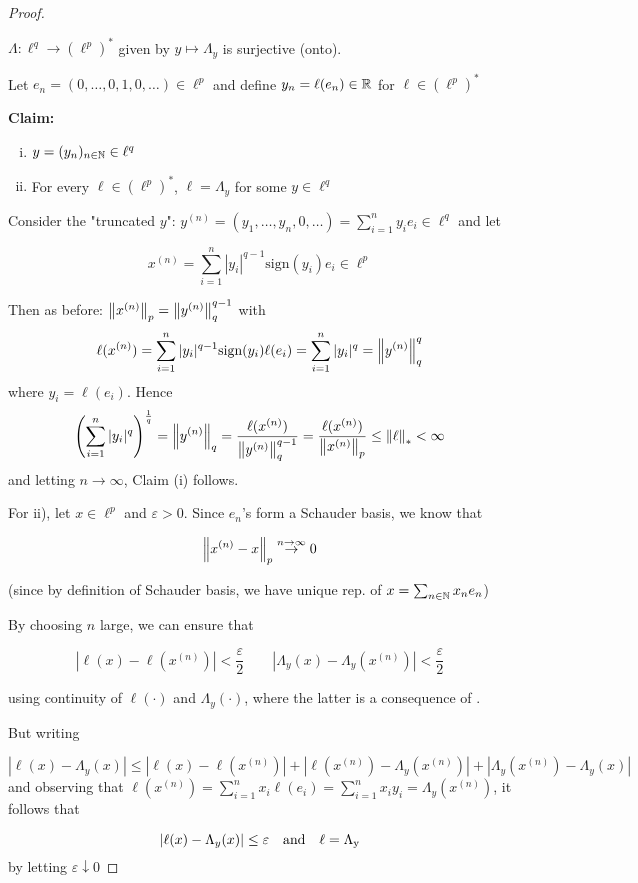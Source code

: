 \documentclass{article}
\begin{document}
\begin{proof}
\begin{lemma}
     \(\Lambda: \ell^q \to (\ell^p)^*\) given by  \(y \mapsto \Lambda_y\) is surjective (onto).
\end{lemma}  
Let  \(e_n = (0, \ldots, 0, 1, 0, \ldots) \in \ell^p\) and define  \(y_n = \ell(e_n) \in \mathbb{R} \)  for  \(\ell \in (\ell^p)^*\)

\textbf{Claim:} 
\begin{enumerate}[i)]
    \item  \(y = (y_n)_{n \in \mathbb{N}} \in \ell^q\)
    \item  For every \(\ell \in (\ell^p)^*\), \(\ell = \Lambda_y\) for some  \(y \in \ell^q \)
\end{enumerate}  

Consider the "truncated $y$":  \(y^{(n)}=(y_1, \ldots, y_n, 0, \ldots) = \sum_{i=1}^n y_i e_i \in \ell^q\) and let

\[x^{(n)}=\sum_{i=1}^{n}|y_{i}|^{q-1} \textrm{sign}(y_i) e_i \in \ell^p\] 

Then as before:  \(\left\|{x^{(n)}}\right\|_p = \left\|{y^{(n)}}\right\|_q^{q-1}\)  
with 
\[
\ell(x^{(n)})=\sum_{i=1}^{n}|y_{i}|^{q-1} \textrm{sign}(y_i) \ell(e_i) = \sum_{i=1}^n |y_i|^q=\left\|{y^{(n)}}\right\|^q_q  
\]
where  \(y_i = \ell(e_i)\). Hence
\[
 \left(\sum_{i=1}^n |y_i|^q \right)^{\frac{1}{q}} = \left\|{y^{(n)}}\right\|_q = \frac{\ell(x^{(n)})}{\left\|{y^{(n)}}\right\|_q^{q-1}} = \frac{\ell(x^{(n)})}{\left\|{x^{(n)}}\right\|_p} \leq \left\|{\ell}\right\|_* < \infty
\]
and letting  \(n \to \infty\), Claim (i) follows.  

For ii), let  \(x \in \ell^p\) and  \(\varepsilon > 0\). Since  \(e_n\)'s form a Schauder basis, we know that  

\[\left\|{x^{(n)}-x}\right\|_p \overset{n \to \infty}{\rightarrow} 0\]  

(since by definition of Schauder basis, we have unique rep. of  \(x = \sum_{n \in \mathbb{N}} x_n e_n\))

By choosing  \(n\) large, we can ensure that  

\[|\ell(x)-\ell(x^{(n)})|<\frac{\varepsilon}{2} \qquad |\Lambda_y(x)-\Lambda_y(x^{(n)})| < \frac{\varepsilon}{2}\]  

using continuity of  \(\ell(\cdot)\) and  \(\Lambda_y(\cdot)\), where the latter is a consequence of .  

But writing  

\begin{equation}
|\ell(x)-\Lambda_y(x)| \leq |\ell(x)- \ell(x^{(n)})| + |\ell(x^{(n)}) - \Lambda_y(x^{(n)})|+|\Lambda_y(x^{(n)})-\Lambda_y(x)|
\end{equation}  
and observing that  \(\ell(x^{(n)})=\sum_{i=1}^n x_i \ell(e_i) = \sum_{i=1}^n x_i y_i = \Lambda_y(x^{(n)})\), it follows that  

\[
|\ell(x)-\Lambda_y(x)| \leq \varepsilon \quad \rm{and} \quad \ell=\Lambda_y
\]  
by letting  \(\varepsilon \downarrow 0\)
\end{proof}
\end{document}
